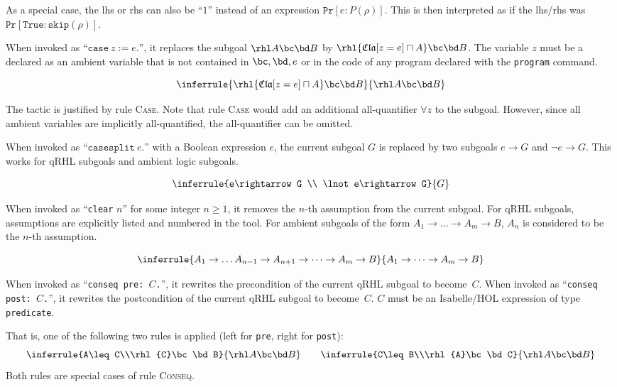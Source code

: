\documentclass{article}
\renewcommand\ruleref[1]{rule \hbox{\textsc{#1}}}
\begin{document}
As a special case, the lhs or rhs can also be ``$1$'' instead of an
expression $\mathtt{Pr}[e:P(\rho)]$. This is then interpreted as if
the lhs/rhs was $\mathtt{Pr}[\mathtt{True}:\mathtt{skip}(\rho)]$.



When invoked as ``$\mathtt{case}\ z := e\mathtt{.}$'',
it replaces the subgoal $\rhl A\bc\bd B$
by $\rhl{\mathfrak{Cla}[z=e]\sqcap A}\bc\bd B$.
The variable $z$
must be a declared as an ambient variable that is not contained in
$\bc,\bd,e$
or in the code of any program declared with the \texttt{program} command.

\[
\inferrule
{\rhl{\mathfrak{Cla}[z=e]\sqcap A}\bc\bd B}
{\rhl A\bc\bd B}
\]

The tactic is justified by \ruleref{Case}. Note that \ruleref{Case}
would add an additional all-quantifier $\forall z$
to the subgoal. However, since all ambient variables are implicitly
all-quantified, the all-quantifier can be omitted.



When invoked as ``$\mathtt{casesplit}\ e\mathtt{.}$''
with a Boolean expression $e$,
the current subgoal $G$
is replaced by two subgoals $e\rightarrow G$
and $\lnot e\rightarrow G$.
This works for qRHL subgoals and ambient logic subgoals.

\[
  \inferrule
  {e\rightarrow G
    \\
    \lnot e\rightarrow G}
  {G}
\]


When invoked as ``\texttt{clear} $n$''
for some integer $n\geq 1$,
it removes the $n$-th
assumption from the current subgoal. For qRHL subgoals, assumptions
are explicitly listed and numbered in the tool. For ambient subgoals of the form
$A_1\to \dots \to A_m\to B$,
$A_n$ is considered to be the $n$-th assumption.

\[
  \inferrule
  {A_1\to \dots A_{n-1}\to A_{n+1}\to\dots \to A_m\to B}
  {A_1\to \dots \to A_m\to B}
\]




When invoked as ``\texttt{conseq pre: $C$.}'',
it rewrites the precondition of the current qRHL subgoal to become~$C$.
When invoked as ``\texttt{conseq post: $C$.}'',
it rewrites the postcondition of the current qRHL subgoal to become~$C$.
$C$ must be an Isabelle/HOL expression of type \texttt{predicate}.

That is, one of the following two rules is applied (left for
\texttt{pre}, right for \texttt{post}):
\[
  \inferrule{A\leq C\\\rhl{C}\bc\bd B}{\rhl A\bc\bd B}
  \qquad
  \inferrule{C\leq B\\\rhl{A}\bc\bd C}{\rhl A\bc\bd B}
\]
%
Both rules are special cases of \ruleref{Conseq}.
\end{document}
